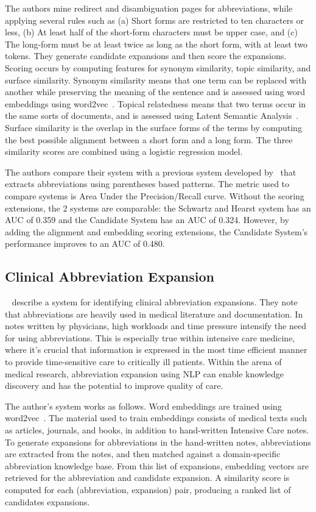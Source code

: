 \documentclass[11pt,a4paper]{article}
\begin{document}
The authors mine redirect and disambiguation pages for abbreviations,
while applying several rules such as (a) Short forms are restricted to
ten characters or less, (b) At least half of the short-form characters
must be upper case, and (c) The long-form must be at least twice as
long as the short form, with at least two tokens.  They generate
candidate expansions and then score the expansions.  Scoring occurs by
computing features for synonym similarity, topic similarity, and
surface similarity.  Synonym similarity means that one term can be
replaced with another while preserving the meaning of the sentence and
is assessed using word embeddings using word2vec~\cite{NIPS2013_5021}.
Topical relatedness means that two terms occur in the same sorts of
documents, and is assessed using Latent Semantic
Analysis~\cite{deerwester-indexing-1990}.  Surface similarity is the
overlap in the surface forms of the terms by computing the best
possible alignment between a short form and a long form.   The three
similarity scores are combined using a logistic regression model.

The authors compare their system with a previous system developed
by~\cite{SchwartzH03} that extracts abbreviations using parentheses
based patterns.  The metric used to compare systems is Area Under the
Precision/Recall curve.  Without the scoring extensions, the 2 systems
are comparable: the Schwartz and Hearst system has an AUC of 0.359 and
the Candidate System has an AUC of 0.324.  However, by adding the
alignment and embedding scoring extensions, the Candidate System’s
performance improves to an AUC of 0.480. 

\subsection{Clinical Abbreviation Expansion}
~\cite{liu-etal-2015-exploiting} describe a system for identifying clinical abbreviation
expansions.  They note that abbreviations are heavily used in medical
literature and documentation.  In notes written by physicians, high
workloads and time pressure intensify the need for using
abbreviations.  This is especially true within intensive care
medicine, where it’s crucial that information is expressed in the most
time efficient manner to provide time-sensitive care to critically ill
patients.  Within the arena of medical research, abbreviation
expansion using NLP can enable knowledge discovery and has the
potential to improve quality of care.

The author's system works as follows.  Word embeddings are trained
using word2vec~\cite{NIPS2013_5021}.  The material used to train embeddings consists of
medical  texts such as articles, journals, and books, in addition to
hand-written Intensive Care notes.  To generate expansions for
abbreviations in the hand-written notes, abbreviations are extracted
from the notes, and then matched against a domain-specific
abbreviation knowledge base.  From this list of expansions, 
embedding vectors are retrieved for the abbreviation and candidate
expansion.  A similarity score is computed for each (abbreviation,
expansion) pair, producing a ranked list of candidates expansions.
\end{document}
